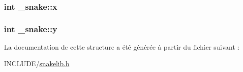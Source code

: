 \subsubsection[{\texorpdfstring{x}{x}}]{\setlength{\rightskip}{0pt plus 5cm}int \+\_\+snake\+::x}\hypertarget{struct__snake_a58c7bdb2d495a8590718f12d2f7b4c20}{}\label{struct__snake_a58c7bdb2d495a8590718f12d2f7b4c20}
\subsubsection[{\texorpdfstring{y}{y}}]{\setlength{\rightskip}{0pt plus 5cm}int \+\_\+snake\+::y}\hypertarget{struct__snake_a8739255d28f8c276b848dedda629a5d3}{}\label{struct__snake_a8739255d28f8c276b848dedda629a5d3}


La documentation de cette structure a été générée à partir du fichier suivant \+:\begin{DoxyCompactItemize}
\item 
I\+N\+C\+L\+U\+D\+E/\hyperlink{snakelib_8h}{snakelib.\+h}\end{DoxyCompactItemize}
